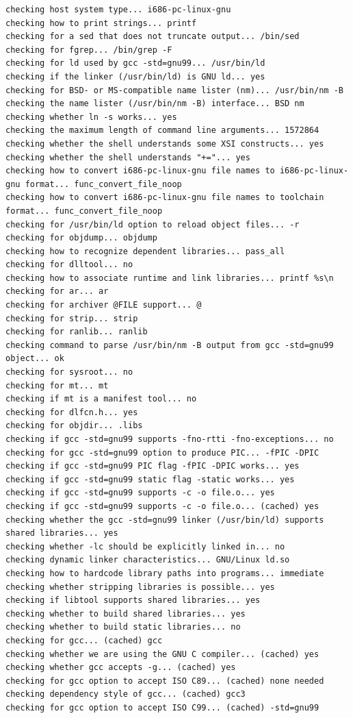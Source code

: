 \documentclass[11pt,a4paper]{article}
\begin{document}
{\begin{shaded}
\begin{verbatim}
checking host system type... i686-pc-linux-gnu
checking how to print strings... printf
checking for a sed that does not truncate output... /bin/sed
checking for fgrep... /bin/grep -F
checking for ld used by gcc -std=gnu99... /usr/bin/ld
checking if the linker (/usr/bin/ld) is GNU ld... yes
checking for BSD- or MS-compatible name lister (nm)... /usr/bin/nm -B
checking the name lister (/usr/bin/nm -B) interface... BSD nm
checking whether ln -s works... yes
checking the maximum length of command line arguments... 1572864
checking whether the shell understands some XSI constructs... yes
checking whether the shell understands "+="... yes
checking how to convert i686-pc-linux-gnu file names to i686-pc-linux-gnu format... func_convert_file_noop
checking how to convert i686-pc-linux-gnu file names to toolchain format... func_convert_file_noop
checking for /usr/bin/ld option to reload object files... -r
checking for objdump... objdump
checking how to recognize dependent libraries... pass_all
checking for dlltool... no
checking how to associate runtime and link libraries... printf %s\n
checking for ar... ar
checking for archiver @FILE support... @
checking for strip... strip
checking for ranlib... ranlib
checking command to parse /usr/bin/nm -B output from gcc -std=gnu99 object... ok
checking for sysroot... no
checking for mt... mt
checking if mt is a manifest tool... no
checking for dlfcn.h... yes
checking for objdir... .libs
checking if gcc -std=gnu99 supports -fno-rtti -fno-exceptions... no
checking for gcc -std=gnu99 option to produce PIC... -fPIC -DPIC
checking if gcc -std=gnu99 PIC flag -fPIC -DPIC works... yes
checking if gcc -std=gnu99 static flag -static works... yes
checking if gcc -std=gnu99 supports -c -o file.o... yes
checking if gcc -std=gnu99 supports -c -o file.o... (cached) yes
checking whether the gcc -std=gnu99 linker (/usr/bin/ld) supports shared libraries... yes
checking whether -lc should be explicitly linked in... no
checking dynamic linker characteristics... GNU/Linux ld.so
checking how to hardcode library paths into programs... immediate
checking whether stripping libraries is possible... yes
checking if libtool supports shared libraries... yes
checking whether to build shared libraries... yes
checking whether to build static libraries... no
checking for gcc... (cached) gcc
checking whether we are using the GNU C compiler... (cached) yes
checking whether gcc accepts -g... (cached) yes
checking for gcc option to accept ISO C89... (cached) none needed
checking dependency style of gcc... (cached) gcc3
checking for gcc option to accept ISO C99... (cached) -std=gnu99

\end{verbatim}
\end{shaded}}
\end{document}
